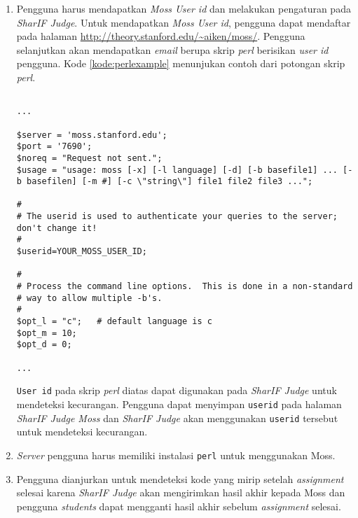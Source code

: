 \begin{enumerate}
\item Pengguna harus mendapatkan \textit{Moss User id} dan melakukan pengaturan pada \textit{SharIF Judge}. Untuk mendapatkan \textit{Moss User id}, pengguna dapat mendaftar pada halaman \url{http://theory.stanford.edu/~aiken/moss/}. Pengguna selanjutkan akan mendapatkan \textit{email} berupa skrip \textit{perl} berisikan \textit{user id} pengguna. Kode \ref{kode:perlexample} menunjukan contoh dari potongan skrip \textit{perl}.

\begin{lstlisting}[caption=Contoh potongan skrip \textit{perl}, label=kode:perlexample]

...

$server = 'moss.stanford.edu';
$port = '7690';
$noreq = "Request not sent.";
$usage = "usage: moss [-x] [-l language] [-d] [-b basefile1] ... [-b basefilen] [-m #] [-c \"string\"] file1 file2 file3 ...";

#
# The userid is used to authenticate your queries to the server; don't change it!
#
$userid=YOUR_MOSS_USER_ID;

#
# Process the command line options.  This is done in a non-standard
# way to allow multiple -b's.
#
$opt_l = "c";   # default language is c
$opt_m = 10;
$opt_d = 0;

...

\end{lstlisting}
\texttt{User id} pada skrip \textit{perl} diatas dapat digunakan pada \textit{SharIF Judge} untuk mendeteksi kecurangan. Pengguna dapat menyimpan \texttt{userid} pada halaman \textit{SharIF Judge Moss} dan \textit{SharIF Judge} akan menggunakan \texttt{userid} tersebut untuk mendeteksi kecurangan.

\item \textit{Server} pengguna harus memiliki instalasi \verb|perl| untuk menggunakan Moss.
\item Pengguna dianjurkan untuk mendeteksi kode yang mirip setelah \textit{assignment} selesai karena \textit{SharIF Judge} akan mengirimkan hasil akhir kepada Moss dan pengguna \textit{students} dapat mengganti hasil akhir sebelum \textit{assignment} selesai.
\end{enumerate}

